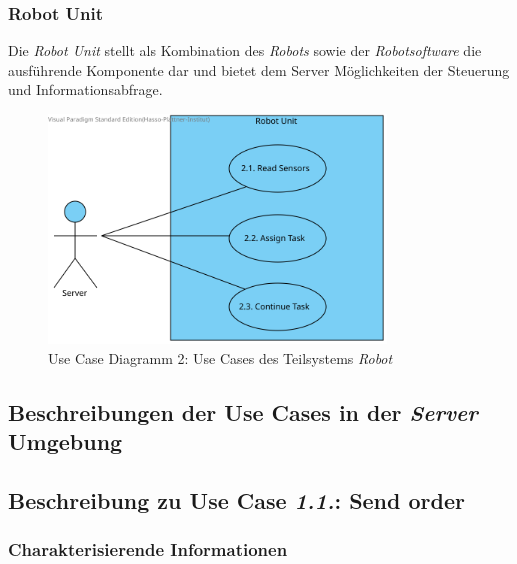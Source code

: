			\subsubsection{Robot Unit}
			Die \emph{Robot Unit} stellt als Kombination des \emph{Robots} sowie der \emph{Robotsoftware} die ausführende Komponente dar und bietet dem Server Möglichkeiten der Steuerung und Informationsabfrage.
				\begin{figure}[H]
					\centering
					\includegraphics[width=0.8\textwidth]{img/2-Analyse-RobotUnit}
					\caption{Use Case Diagramm 2: Use Cases des Teilsystems \emph{Robot}}
					\label{fig:3-1-use-cases-robot-unit}
				\end{figure}

		\pagebreak

		\subsection{Beschreibungen der Use Cases in der \emph{Server} Umgebung}
			\subsection*{Beschreibung zu Use Case \emph{1.1.}: Send order}	
			\subsubsection*{Charakterisierende Informationen}
			
